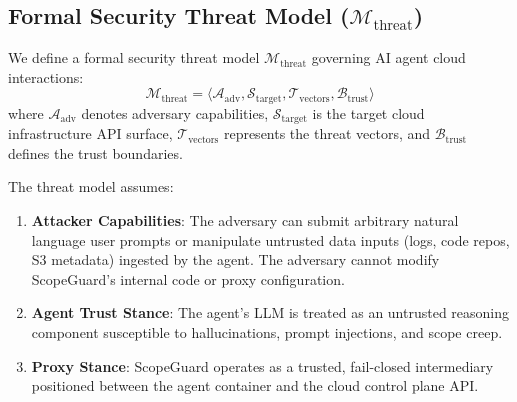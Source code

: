 \documentclass[conference]{IEEEtran}
\begin{document}
\subsection{Formal Security Threat Model ($\mathcal{M}_{\text{threat}}$)}
We define a formal security threat model $\mathcal{M}_{\text{threat}}$ governing AI agent cloud interactions:
\begin{equation}
\mathcal{M}_{\text{threat}} = \langle \mathcal{A}_{\text{adv}}, \mathcal{S}_{\text{target}}, \mathcal{T}_{\text{vectors}}, \mathcal{B}_{\text{trust}} \rangle
\end{equation}
where $\mathcal{A}_{\text{adv}}$ denotes adversary capabilities, $\mathcal{S}_{\text{target}}$ is the target cloud infrastructure API surface, $\mathcal{T}_{\text{vectors}}$ represents the threat vectors, and $\mathcal{B}_{\text{trust}}$ defines the trust boundaries.

The threat model assumes:
\begin{enumerate}
    \item \textbf{Attacker Capabilities}: The adversary can submit arbitrary natural language user prompts or manipulate untrusted data inputs (logs, code repos, S3 metadata) ingested by the agent. The adversary cannot modify ScopeGuard's internal code or proxy configuration.
    \item \textbf{Agent Trust Stance}: The agent's LLM is treated as an untrusted reasoning component susceptible to hallucinations, prompt injections, and scope creep.
    \item \textbf{Proxy Stance}: ScopeGuard operates as a trusted, fail-closed intermediary positioned between the agent container and the cloud control plane API.
\end{enumerate}
\end{document}
